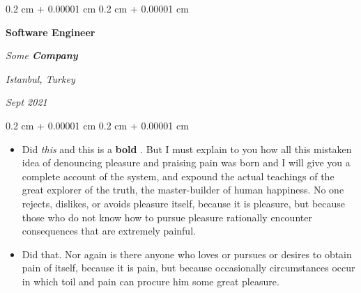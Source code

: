 \documentclass[10pt, letterpaper]{article}
\newenvironment{highlights}{
    \begin{itemize}[
        topsep=0.10 cm,
        parsep=0.10 cm,
        partopsep=0pt,
        itemsep=0pt,
        leftmargin=0.4 cm + 10pt
    ]
}{
    \end{itemize}
} %
\newenvironment{onecolentry}{
    \begin{adjustwidth}{
        0.2 cm + 0.00001 cm
    }{
        0.2 cm + 0.00001 cm
    }
}{
    \end{adjustwidth}
} %
\newenvironment{twocolentry}[2][]{
    \onecolentry
    \def\secondColumn{#2}
    \setcolumnwidth{\fill, 4.5 cm}
    \begin{paracol}{2}
}{
    \switchcolumn \raggedleft \secondColumn
    \end{paracol}
    \endonecolentry
} %
\let\hrefWithoutArrow\href
\renewcommand{\href}[2]{\hrefWithoutArrow{#1}{\ifthenelse{\equal{#2}{}}{ }{#2 }\raisebox{.15ex}{\footnotesize \faExternalLink*}}}
\begin{document}
        \vspace{0.2 cm}

        \begin{twocolentry}{
        \textit{Istanbul, Turkey}    
            
        \textit{Sept 2021}}
            \textbf{Software Engineer}
            
            \textit{Some \textbf{Company}}
        \end{twocolentry}
        \vspace{0.10 cm}
        \begin{onecolentry}
            \begin{highlights}
                \item Did \textit{this} and this is a \textbf{bold} \href{https://example.com}{link}. But I must explain to you how all this mistaken idea of denouncing pleasure and praising pain was born and I will give you a complete account of the system, and expound the actual teachings of the great explorer of the truth, the master-builder of human happiness. No one rejects, dislikes, or avoids pleasure itself, because it is pleasure, but because those who do not know how to pursue pleasure rationally encounter consequences that are extremely painful.
                \item Did that. Nor again is there anyone who loves or pursues or desires to obtain pain of itself, because it is pain, but because occasionally circumstances occur in which toil and pain can procure him some great pleasure.
            \end{highlights}
        \end{onecolentry}


        \vspace{0.2 cm}
\end{document}
